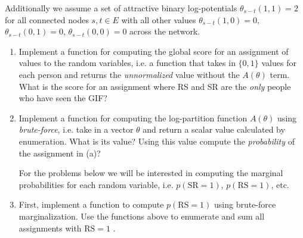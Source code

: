 \documentclass[10pt]{harvardml}
\theoremstyle{plain}
\begin{document}
Additionally we assume a set of attractive binary log-potentials $\theta_{s - t}(1, 1) = 2$ for all connected nodes $s, t \in E$  with all other values $\theta_{s - t}(1, 0) = 0$, $\theta_{s - t}(0, 1) = 0$, $\theta_{s - t}(0, 0) = 0$  across the network.

\noindent


\begin{problem}[30pts]



  \begin{enumerate}[label=(\alph*)]

(Note: for this problem you will be deriving several properties of
    undirected graphical models and implementing these properties in
    Python/PyTorch. Before getting started it is worth getting
    familiar with the \texttt{itertools} package in Python and also
    being sure you understand how PyTorch variables work. In
    particular try writing a simple scalar function with several
    vector-valued Variables as inputs and making you understand
    what the function \texttt{.backward} does in practice.)


~


\item Implement a function for computing the global score for an
  assignment of values to the random variables, i.e. a function that
  takes in $\{0, 1\}$ values for each person and returns the
  \textit{unnormalized} value without the $A(\theta)$ term.  What is
  the score for an assignment where RS and SR are the \textit{only}
  people who have seen the GIF?

\item Implement a function for computing the log-partition function
  $A(\theta)$ using \textit{brute-force}, i.e. take in a vector
  $\theta$ and return a scalar value calculated by enumeration. What
  is its value?  Using this value compute the \textit{probability} of
  the assignment in (a)?



\vspace*{0.5cm}

 For the problems below we will be interested in computing the
  marginal probabilities for each random variable, i.e. $p(\text{SR}=1)$,
  $p(\text{RS}=1)$, etc.

\item  First, implement a function to compute $p(\text{RS}=1)$ using
  brute-force marginalization. Use the functions above to enumerate and sum all assignments with $\text{RS}=1$ .


\end{enumerate}
\end{problem}
\end{document}
